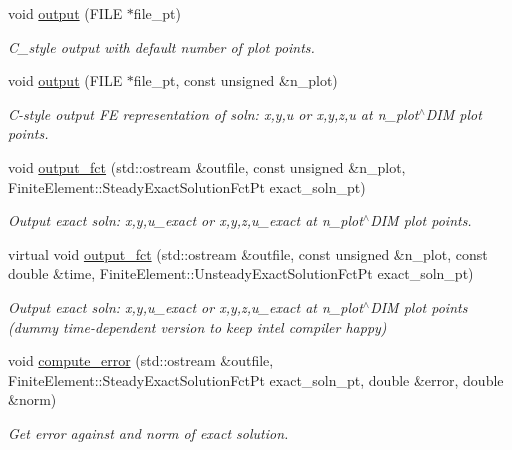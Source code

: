 \begin{DoxyCompactItemize}
void \hyperlink{classoomph_1_1MyShellEquations_aa8411334811e9b382d2c96051ac4b2ba}{output} (F\+I\+LE $\ast$file\+\_\+pt)
\begin{DoxyCompactList}\small\item\em C\+\_\+style output with default number of plot points. \end{DoxyCompactList}\item 
void \hyperlink{classoomph_1_1MyShellEquations_adc1fcb6052b2cd07efe4d7d841ed6723}{output} (F\+I\+LE $\ast$file\+\_\+pt, const unsigned \&n\+\_\+plot)
\begin{DoxyCompactList}\small\item\em C-\/style output FE representation of soln\+: x,y,u or x,y,z,u at n\+\_\+plot$^\wedge$\+D\+IM plot points. \end{DoxyCompactList}\item 
void \hyperlink{classoomph_1_1MyShellEquations_a882f6447d8e204962a3f2a350c6315c4}{output\+\_\+fct} (std\+::ostream \&outfile, const unsigned \&n\+\_\+plot, Finite\+Element\+::\+Steady\+Exact\+Solution\+Fct\+Pt exact\+\_\+soln\+\_\+pt)
\begin{DoxyCompactList}\small\item\em Output exact soln\+: x,y,u\+\_\+exact or x,y,z,u\+\_\+exact at n\+\_\+plot$^\wedge$\+D\+IM plot points. \end{DoxyCompactList}\item 
virtual void \hyperlink{classoomph_1_1MyShellEquations_a7022e91eaf4bff9044e46549bbe0c3f5}{output\+\_\+fct} (std\+::ostream \&outfile, const unsigned \&n\+\_\+plot, const double \&time, Finite\+Element\+::\+Unsteady\+Exact\+Solution\+Fct\+Pt exact\+\_\+soln\+\_\+pt)
\begin{DoxyCompactList}\small\item\em Output exact soln\+: x,y,u\+\_\+exact or x,y,z,u\+\_\+exact at n\+\_\+plot$^\wedge$\+D\+IM plot points (dummy time-\/dependent version to keep intel compiler happy) \end{DoxyCompactList}\item 
void \hyperlink{classoomph_1_1MyShellEquations_a72cb38c977990a46780dfedab0fee8b8}{compute\+\_\+error} (std\+::ostream \&outfile, Finite\+Element\+::\+Steady\+Exact\+Solution\+Fct\+Pt exact\+\_\+soln\+\_\+pt, double \&error, double \&norm)
\begin{DoxyCompactList}\small\item\em Get error against and norm of exact solution. \end{DoxyCompactList}\item 

\end{DoxyCompactItemize}
